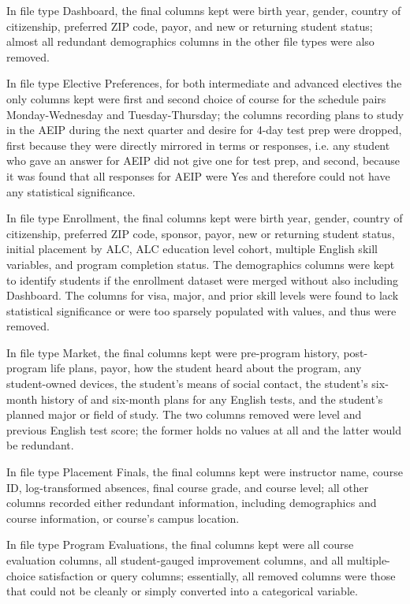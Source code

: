 \documentclass[12pt,letterpaper]{article}
\begin{document}
In file type Dashboard, the final columns kept were birth year, gender, country of citizenship, preferred ZIP code, payor, and new or returning student status; almost all redundant demographics columns in the other file types were also removed.

In file type Elective Preferences, for both intermediate and advanced electives the only columns kept were first and second choice of course for the schedule pairs Monday-Wednesday and Tuesday-Thursday; the columns recording plans to study in the AEIP during the next quarter and desire for 4-day test prep were dropped, first because they were directly mirrored in terms or responses, i.e. any student who gave an answer for AEIP did not give one for test prep, and second, because it was found that all responses for AEIP were Yes and therefore could not have any statistical significance.

In file type Enrollment, the final columns kept were birth year, gender, country of citizenship, preferred ZIP code, sponsor, payor, new or returning student status, initial placement by ALC, ALC education level cohort, multiple English skill variables, and program completion status. The demographics columns were kept to identify students if the enrollment dataset were merged without also including Dashboard. The columns for visa, major, and prior skill levels were found to lack statistical significance or were too sparsely populated with values, and thus were removed.

In file type Market, the final columns kept were pre-program history, post-program life plans, payor, how the student heard about the program, any student-owned devices, the student’s means of social contact, the student’s six-month history of and six-month plans for any English tests, and the student’s planned major or field of study. The two columns removed were level and previous English test score; the former holds no values at all and the latter would be redundant.

In file type Placement Finals, the final columns kept were instructor name, course ID, log-transformed absences, final course grade, and course level; all other columns recorded either redundant information, including demographics and course information, or course’s campus location.

In file type Program Evaluations, the final columns kept were all course evaluation columns, all student-gauged improvement columns, and all multiple-choice satisfaction or query columns; essentially, all removed columns were those that could not be cleanly or simply converted into a categorical variable.
\end{document}
